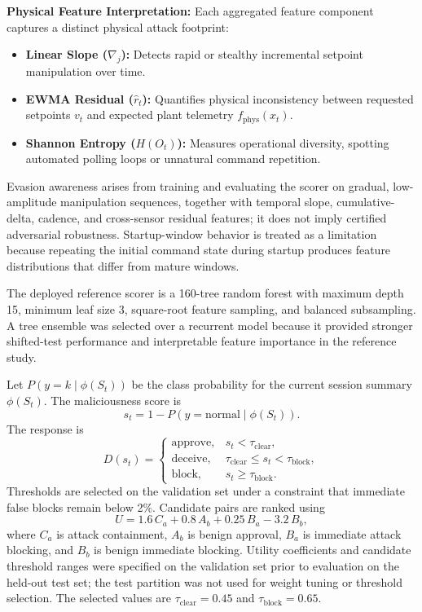 \documentclass[journal]{IEEEtran}
\begin{document}
\noindent\textbf{Physical Feature Interpretation:} Each aggregated feature component captures a distinct physical attack footprint:
\begin{itemize}
    \item \textbf{Linear Slope ($\nabla_j$):} Detects rapid or stealthy incremental setpoint manipulation over time.
    \item \textbf{EWMA Residual ($\hat{r}_t$):} Quantifies physical inconsistency between requested setpoints $v_t$ and expected plant telemetry $f_{\mathrm{phys}}(x_t)$.
    \item \textbf{Shannon Entropy ($H(O_t)$):} Measures operational diversity, spotting automated polling loops or unnatural command repetition.
\end{itemize}

Evasion awareness arises from training and evaluating the scorer on gradual, low-amplitude manipulation sequences, together with temporal slope, cumulative-delta, cadence, and cross-sensor residual features; it does not imply certified adversarial robustness. Startup-window behavior is treated as a limitation because repeating the initial command state during startup produces feature distributions that differ from mature windows.

The deployed reference scorer is a 160-tree random forest with maximum depth 15, minimum leaf size 3, square-root feature sampling, and balanced subsampling. A tree ensemble was selected over a recurrent model because it provided stronger shifted-test performance and interpretable feature importance in the reference study.

Let $P(y=k\mid \phi(S_t))$ be the class probability for the current session summary $\phi(S_t)$. The maliciousness score is
\begin{equation}
 s_t = 1 - P(y = \mathrm{normal} \mid \phi(S_t)).
\end{equation}
The response is
\begin{equation}
 D(s_t) =
 \begin{cases}
 \mathrm{approve}, & s_t < \tau_{\mathrm{clear}}, \\[2pt]
 \mathrm{deceive}, & \tau_{\mathrm{clear}} \le s_t < \tau_{\mathrm{block}}, \\[2pt]
 \mathrm{block}, & s_t \ge \tau_{\mathrm{block}}.
 \end{cases}
\end{equation}
Thresholds are selected on the validation set under a constraint that immediate false blocks remain below 2\%. Candidate pairs are ranked using
\begin{equation}
U = 1.6\,C_a + 0.8\,A_b + 0.25\,B_a - 3.2\,B_b,
\end{equation}
where $C_a$ is attack containment, $A_b$ is benign approval, $B_a$ is immediate attack blocking, and $B_b$ is benign immediate blocking. Utility coefficients and candidate threshold ranges were specified on the validation set prior to evaluation on the held-out test set; the test partition was not used for weight tuning or threshold selection. The selected values are $\tau_{\mathrm{clear}} = 0.45$ and $\tau_{\mathrm{block}} = 0.65$.
\end{document}
